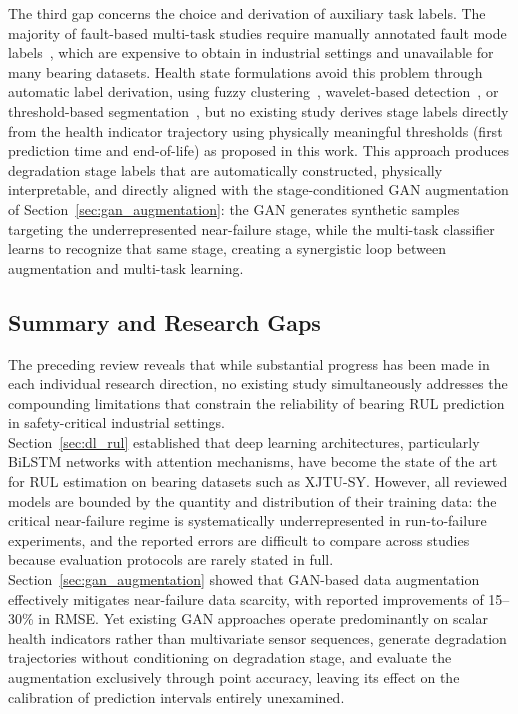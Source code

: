 \documentclass[review]{elsarticle}
\begin{document}
The third gap concerns the choice and derivation of auxiliary task
labels. The majority of fault-based multi-task studies require
manually annotated fault mode
labels~\cite{8709822, LAI2026112091, 11434241}, which are expensive
to obtain in industrial settings and unavailable for many bearing
datasets. Health state formulations avoid this problem through
automatic label derivation, using fuzzy
clustering~\cite{10295667}, wavelet-based detection~\cite{11363290},
or threshold-based
segmentation~\cite{zhang_health_2022, 11451867}, but no existing
study derives stage labels directly from the health indicator
trajectory using physically meaningful thresholds (first prediction
time and end-of-life) as proposed in this work. This approach
produces degradation stage labels that are automatically constructed,
physically interpretable, and directly aligned with the
stage-conditioned GAN augmentation of
Section~\ref{sec:gan_augmentation}: the GAN generates synthetic
samples targeting the underrepresented near-failure stage, while the
multi-task classifier learns to recognize that same stage, creating a
synergistic loop between augmentation and multi-task learning.


\subsection{Summary and Research Gaps}
\label{sec:summary_gaps}

The preceding review reveals that while substantial progress has been
made in each individual research direction, no existing study
simultaneously addresses the compounding limitations that
constrain the reliability of bearing RUL prediction in
safety-critical industrial settings.\\

Section~\ref{sec:dl_rul} established that deep learning architectures,
particularly BiLSTM networks with attention mechanisms, have
become the state of the art for RUL estimation on bearing datasets
such as XJTU-SY. However, all reviewed models are bounded by the
quantity and distribution of their training data: the critical
near-failure regime is systematically underrepresented in
run-to-failure experiments, and the reported errors are difficult to
compare across studies because evaluation protocols are rarely stated
in full.\\

Section~\ref{sec:gan_augmentation} showed that GAN-based data
augmentation effectively mitigates near-failure data scarcity, with
reported improvements of 15--30\% in RMSE. Yet existing GAN
approaches operate predominantly on scalar health indicators rather
than multivariate sensor sequences, generate degradation trajectories
without conditioning on degradation stage, and evaluate the
augmentation exclusively through point accuracy, leaving its effect on
the calibration of prediction intervals entirely unexamined.\\
\end{document}
